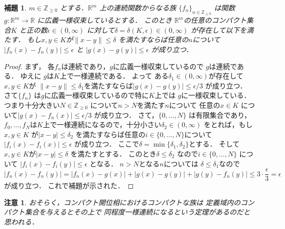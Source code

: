 \documentclass[leqno, a4paper, 12pt]{jsarticle}
\newtheorem{lem}[thm]{補題}
\newtheorem*{cau}{注意}
\newcommand{\zz}{\mathbb{Z}}
\newcommand{\rr}{\mathbb{R}}
\begin{document}
\begin{lem}\label{lem:hodai}
$m\in \zz_{\ge 0}$
とする．$\rr^{m}$
上の連続関数からなる族
$\{f_{n}\}_{n\in \zz_{\ge 0}}$
は関数$g\colon \rr^{m}\to \rr$
に広義一様収束しているとする．
このとき
$\rr^{m}$の任意のコンパクト集合$K$
と正の数$\epsilon \in (0, \infty)$
に対して$\delta=\delta(K, \epsilon)\in (0, \infty)$
が存在して以下を満たす．
もし$x, y\in K$が$\|x-y\|\le \delta$
を満たすならば任意の$n$について
$|f_{n}(x)-f_{n}(y)|\le \epsilon$ 
と
$|g(x)-g(y)|\le \epsilon$
が成り立つ．
\end{lem}
\begin{proof}
まず，
各$f_{n}$は連続であり，$g$に広義一様収束しているので
$g$は連続である．
ゆえに
$g$は$K$上で一様連続である．
よって
ある$\delta_{1}\in (0, \infty)$が存在して
$x, y\in K$が
$\|x-y\|\le \delta_{1}$を満たすならば$|g(x)-g(y)|\le \epsilon/3$
が成り立つ．
さて$\{f_{n}\}$
は$g$に広義一様収束しているので特に$K$上では
$g$に一様収束している．
つまり十分大きい$N\in \zz_{\ge 0}$
について$n>N$を満たす$n$について
任意の$x\in K$
について$|g(x)-f_{n}(x)|\le \epsilon/3$
が成り立つ．
さて，$\{0, \dots, N\}$
は有限集合であり，
$f_{0}, \dots, f_{N}$は$K$上で一様連続になるので，十分小さい$\delta_{2}\in (0, \infty)$
をとれば，もし$x, y\in K$
が$|x-y|\le \delta_{2}$
を満たすならば任意の$i\in \{0, \dots, N\}$について
$|f_{i}(x)-f_{i}(x)|\le \epsilon$
が成り立つ．
ここで$\delta=\min\{\delta_{1}, \delta_{2}\}$とする．
そして
$x, y\in K$が$|x-y|\le \delta$
を満たすとする．
このとき$\delta\le \delta_{2}$
なので$i\in \{0, \dots, N\}$
について
$|f_{i}(x)-f_{i}(y)|\le \epsilon$
となる．
$n>N$となる$n$については
$\delta\le \delta_{1}$なので
\[
|f_{n}(x)-f_{n}(y)|
=|f_{n}(x)-g(x)|
+|g(x)-g(y)|
+
|g(y)-f_{n}(y)|
\le 3\cdot \frac{\epsilon}{3}=\epsilon
\]
が成り立つ．
これで補題が示された．
\end{proof}
\begin{cau}
おそらく，コンパクト開位相におけるコンパクトな族は
定義域内のコンパクト集合を与えるとその上で
同程度一様連続になるという定理があるのだと思われる．
\end{cau}
\end{document}
